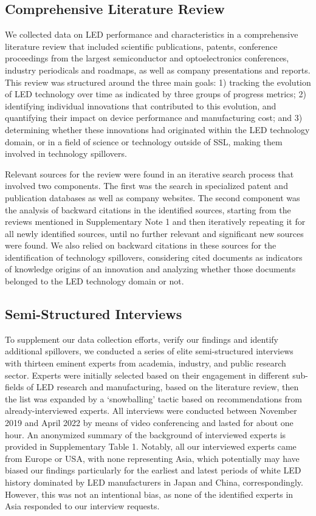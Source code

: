 \documentclass[parskip=full]{article}
\begin{document}
\subsection{Comprehensive Literature Review}

We collected data on LED performance and characteristics in a comprehensive literature review that included scientific publications, patents, conference proceedings from the largest semiconductor and optoelectronics conferences, industry periodicals and roadmaps, as well as company presentations and reports. This review was structured around the three main goals: 1) tracking the evolution of LED technology over time as indicated by three groups of progress metrics; 2) identifying individual innovations that contributed to this evolution, and quantifying their impact on device performance and manufacturing cost; and 3) determining whether these innovations had originated within the LED technology domain, or in a field of science or technology outside of SSL, making them involved in technology spillovers.

Relevant sources for the review were found in an iterative search process that involved two components. The first was the search in specialized patent and publication databases as well as company websites. The second component was the analysis of backward citations in the identified sources, starting from the reviews mentioned in Supplementary Note 1 and then iteratively repeating it for all newly identified sources, until no further relevant and significant new sources were found. We also relied on backward citations in these sources for the identification of technology spillovers, considering cited documents as indicators of knowledge origins of an innovation and analyzing whether those documents belonged to the LED technology domain or not.

\subsection{Semi-Structured Interviews}

To supplement our data collection efforts, verify our findings and identify additional spillovers, we conducted a series of elite semi-structured interviews \cite{tansey2009process} with thirteen eminent experts from academia, industry, and public research sector. Experts were initially selected based on their engagement in different sub-fields of LED research and manufacturing, based on the literature review, then the list was expanded by a ‘snowballing’ tactic based on recommendations from already-interviewed experts. All interviews were conducted between November 2019 and April 2022 by means of video conferencing and lasted for about one hour. An anonymized summary of the background of interviewed experts is provided in Supplementary Table 1. Notably, all our interviewed experts came from Europe or USA, with none representing Asia, which potentially may have biased our findings particularly for the earliest and latest periods of white LED history dominated by LED manufacturers in Japan and China, correspondingly. However, this was not an intentional bias, as none of the identified experts in Asia responded to our interview requests. 
\end{document}
